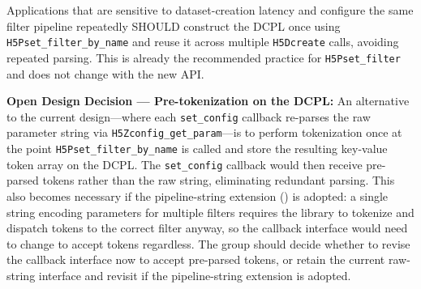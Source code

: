 \documentclass[../HDF5_RFC.tex]{subfiles}
\begin{document}
Applications that are sensitive to dataset-creation latency and configure the
same filter pipeline repeatedly SHOULD construct the DCPL once using
\texttt{H5Pset\_filter\_by\_name} and reuse it across multiple \texttt{H5Dcreate}
calls, avoiding repeated parsing. This is already the recommended practice for
\texttt{H5Pset\_filter} and does not change with the new API.

\noindent\colorbox{yellow!25}{\parbox{\dimexpr\linewidth-2\fboxsep}{%
  \textbf{Open Design Decision --- Pre-tokenization on the DCPL:}
  An alternative to the current design---where each \texttt{set\_config} callback
  re-parses the raw parameter string via \texttt{H5Zconfig\_get\_param}---is to
  perform tokenization once at the point \texttt{H5Pset\_filter\_by\_name} is called
  and store the resulting key-value token array on the DCPL.  The
  \texttt{set\_config} callback would then receive pre-parsed tokens rather than
  the raw string, eliminating redundant parsing.  This also becomes necessary
  if the pipeline-string extension () is
  adopted: a single string encoding parameters for multiple filters requires
  the library to tokenize and dispatch tokens to the correct filter anyway,
  so the callback interface would need to change to accept tokens regardless.
  The group should decide whether to revise the callback interface now to
  accept pre-parsed tokens, or retain the current raw-string interface and
  revisit if the pipeline-string extension is adopted.
}}
\end{document}
